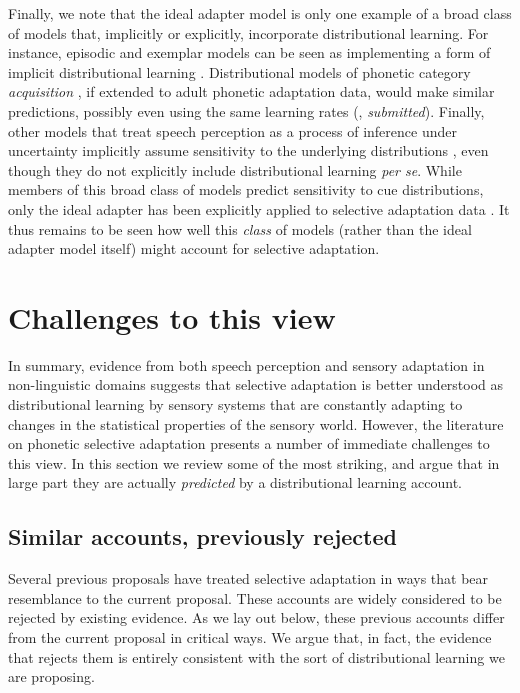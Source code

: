 \label{r2-broader-class-of-models}
Finally, we note that the ideal adapter model is only one example of a broad class of models that, implicitly or explicitly, incorporate distributional learning.  For instance, episodic and exemplar models \cite[e.g.,][]{Goldinger1998,Johnson1997a} can be seen as implementing a form of implicit distributional learning \autocites[as kernel density estimation, cf. ][]{Sanborn2010}[or importance sampling][]{Shi2010}.  Distributional models of phonetic category \emph{acquisition} \autocite[e.g., ][]{Feldman2013a,McMurray2009,Vallabha2007}, if extended to adult phonetic adaptation data, would make similar predictions, possibly even using the same learning rates (\citeauthor{ToscanoSubmitted}, \emph{submitted}).  Finally, other models that treat speech perception as a process of inference under uncertainty implicitly assume sensitivity to the underlying distributions \cite{Clayards2008,Feldman2009a,Norris2008,Sonderegger2010}, even though they do not explicitly include distributional learning \emph{per se}.  While members of this broad class of models predict sensitivity to cue distributions, only the ideal adapter has been explicitly applied to selective adaptation data \cite{Kleinschmidt2015}.  It thus remains to be seen how well this \emph{class} of models (rather than the ideal adapter model itself) might account for selective adaptation.


\section{Challenges to this view}
\label{sec:challenges-this-view}

In summary, evidence from both speech perception and sensory adaptation in non-linguistic domains suggests that selective adaptation is better understood as distributional learning by sensory systems that are constantly adapting to changes in the statistical properties of the sensory world.  However, the literature on phonetic selective adaptation presents a number of immediate challenges to this view.  In this section we review some of the most striking, and argue that in large part they are actually \emph{predicted} by a distributional learning account.

\subsection{Similar accounts, previously rejected}
\label{sec:simil-acco-prev}

Several previous proposals have treated selective adaptation in ways that bear resemblance to the current proposal.  These accounts are widely considered to be rejected by existing evidence.  As we lay out below, these previous accounts differ from the current proposal in critical ways.  We argue that, in fact, the evidence that rejects them is entirely consistent with the sort of distributional learning we are proposing.

